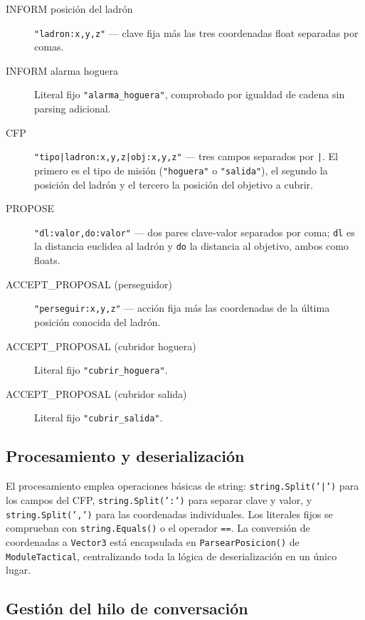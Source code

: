 \documentclass[a4paper,12pt]{article}
\begin{document}
\begin{description}
    \item[INFORM posición del ladrón] \texttt{"ladron:x,y,z"} --- clave fija 
    más las tres coordenadas float separadas por comas.

    \item[INFORM alarma hoguera] Literal fijo \texttt{"alarma\_hoguera"}, 
    comprobado por igualdad de cadena sin parsing adicional.

    \item[CFP] \texttt{"tipo|ladron:x,y,z|obj:x,y,z"} --- tres campos separados 
    por \texttt{|}. El primero es el tipo de misión (\texttt{"hoguera"} o 
    \texttt{"salida"}), el segundo la posición del ladrón y el tercero la 
    posición del objetivo a cubrir.

    \item[PROPOSE] \texttt{"dl:valor,do:valor"} --- dos pares clave-valor 
    separados por coma; \texttt{dl} es la distancia euclidea al ladrón y 
    \texttt{do} la distancia al objetivo, ambos como floats.

    \item[ACCEPT\_PROPOSAL (perseguidor)] \texttt{"perseguir:x,y,z"} --- acción 
    fija más las coordenadas de la última posición conocida del ladrón.

    \item[ACCEPT\_PROPOSAL (cubridor hoguera)] Literal fijo 
    \texttt{"cubrir\_hoguera"}.

    \item[ACCEPT\_PROPOSAL (cubridor salida)] Literal fijo 
    \texttt{"cubrir\_salida"}.
\end{description}

\subsection*{Procesamiento y deserialización}

El procesamiento emplea operaciones básicas de string: \texttt{string.Split('|')} 
para los campos del CFP, \texttt{string.Split(':')} para separar clave y valor, 
y \texttt{string.Split(',')} para las coordenadas individuales. Los literales 
fijos se comprueban con \texttt{string.Equals()} o el operador \texttt{==}. La 
conversión de coordenadas a \texttt{Vector3} está encapsulada en 
\texttt{ParsearPosicion()} de \texttt{ModuleTactical}, centralizando toda la 
lógica de deserialización en un único lugar.

\subsection*{Gestión del hilo de conversación}
\end{document}
